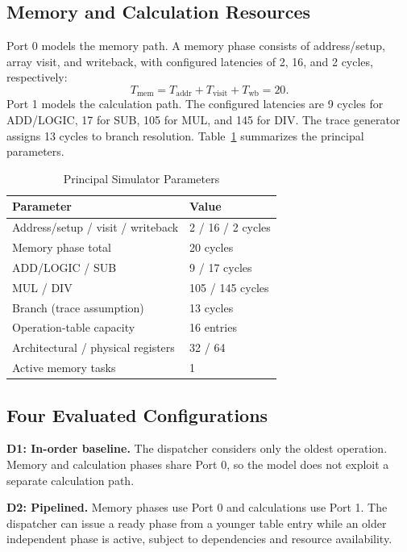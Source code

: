 \documentclass[conference]{IEEEtran}
\begin{document}
\subsection{Memory and Calculation Resources}
Port 0 models the memory path. A memory phase consists of address/setup, array visit, and writeback, with configured latencies of 2, 16, and 2 cycles, respectively:
\begin{equation}
T_{\mathrm{mem}}=T_{\mathrm{addr}}+T_{\mathrm{visit}}+T_{\mathrm{wb}}=20.
\label{eq:mem}
\end{equation}
Port 1 models the calculation path. The configured latencies are 9 cycles for ADD/LOGIC, 17 for SUB, 105 for MUL, and 145 for DIV. The trace generator assigns 13 cycles to branch resolution. Table~\ref{tab:params} summarizes the principal parameters.

\begin{table}[t]
\caption{Principal Simulator Parameters}
\label{tab:params}
\centering
\footnotesize
\begin{tabular}{@{}ll@{}}
\toprule
Parameter & Value\\
\midrule
Address/setup / visit / writeback & 2 / 16 / 2 cycles\\
Memory phase total & 20 cycles\\
ADD/LOGIC / SUB & 9 / 17 cycles\\
MUL / DIV & 105 / 145 cycles\\
Branch (trace assumption) & 13 cycles\\
Operation-table capacity & 16 entries\\
Architectural / physical registers & 32 / 64\\
Active memory tasks & 1\\
\bottomrule
\end{tabular}
\end{table}

\subsection{Four Evaluated Configurations}
\textbf{D1: In-order baseline.} The dispatcher considers only the oldest operation. Memory and calculation phases share Port 0, so the model does not exploit a separate calculation path.

\textbf{D2: Pipelined.} Memory phases use Port 0 and calculations use Port 1. The dispatcher can issue a ready phase from a younger table entry while an older independent phase is active, subject to dependencies and resource availability.
\end{document}
